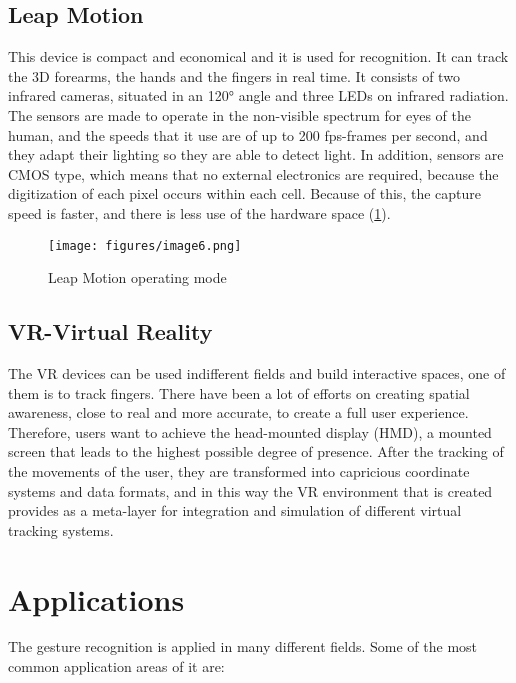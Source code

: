 \documentclass[12pt]{book}
\begin{document}
\section{Leap Motion}\label{s:sec11}
This device is compact and economical and it is used for recognition. It can track the 3D forearms,  the  hands and the fingers in real time. It consists of two infrared cameras, situated in an 120° angle and three LEDs on  infrared radiation. The sensors are made to operate in the non-visible spectrum for eyes of the human, and the speeds that it use are of up to 200 fps-frames per second, and they adapt their lighting so they are able to detect light. In addition, sensors are CMOS type, which means that no external electronics are required, because the digitization of each pixel occurs within each cell. Because of this, the capture speed is faster, and there is less use of the hardware space (\ref{fig:fig6}).

\begin{figure}[!htbp]
\centering
  \texttt{[image: figures/image6.png]}
  \\
  \caption{Leap Motion operating mode \cite{JES2020}}
  \label{fig:fig6}
\end{figure}

\section{VR-Virtual Reality}\label{s:sec12}
The VR devices can be used indifferent fields and build interactive spaces, one of them is to track fingers. There have been a lot of efforts on creating spatial awareness, close to real and more accurate, to create a full user experience. Therefore, users want to achieve the head-mounted display (HMD), a mounted screen that leads to the highest possible degree of presence. After the tracking of the movements of the user, they are transformed into capricious coordinate systems and data formats, and in this way the VR environment that is created provides as a meta-layer for integration and simulation of different virtual tracking systems.

\chapter{Applications}\label{ch:ch3}
The gesture recognition is applied in many different fields. Some of the most common application areas of it are: 
\end{document}
